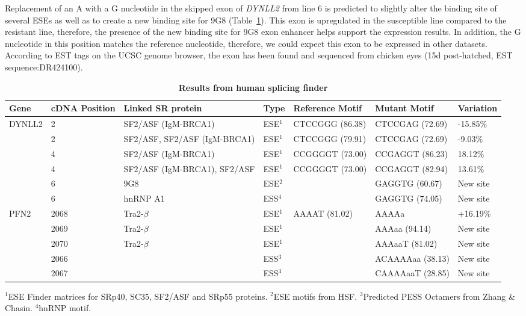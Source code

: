 Replacement of an A with a G nucleotide in the skipped exon of
{\em DYNLL2} from line 6 is predicted to slightly alter the
binding site of several ESEs as well as to create a new binding
site for 9G8 (Table~\ref{tab:spliceosome}).  This exon is
upregulated in the susceptible line compared to the resistant
line, therefore, the presence of the new binding site for 9G8
exon enhancer helps support the expression results.  In addition,
the G nucleotide in this position matches the reference
nucleotide, therefore, we could expect this exon to be expressed
in other datasets.  According to EST tags on the UCSC genome
browser, the exon has been found and sequenced from chicken eyes
(15d post-hatched, EST sequence:DR424100).

\clearpage\pagestyle{lscape}
\begin{landscape}
\begin{table}[!ht]
\caption{
\textbf{Results from human splicing finder}}
\begin{center}
\begin{tabular}{lp{1cm}p{3cm}llll}
\hline
Gene &  cDNA Position & Linked SR protein & Type & Reference Motif & Mutant Motif & Variation \\
\hline
DYNLL2 & 2 & SF2/ASF (IgM-BRCA1) & ESE$^{1}$ & CTCCGGG (86.38) & CTCCGAG (72.69) & -15.85\% \\
& 2 & SF2/ASF, SF2/ASF (IgM-BRCA1) & ESE$^{1}$ & CTCCGGG (79.91) & CTCCGAG (72.69) & -9.03\% \\
& 4 & SF2/ASF (IgM-BRCA1) & ESE$^{1}$& CCGGGGT (73.00) & CCGAGGT (86.23) & 18.12\% \\
& 4 & SF2/ASF (IgM-BRCA1), SF2/ASF & ESE$^{1}$ & CCGGGGT (73.00) & CCGAGGT (82.94) & 13.61\% \\
& 6 & 9G8 & ESE$^{2}$ & & GAGGTG (60.67) & New site \\
& 6 & hnRNP A1 & ESS$^{4}$& & GAGGTG (74.05) & New site \\
\hline
PFN2 & 2068 & Tra2-$\beta$ & ESE$^{1}$ & AAAAT (81.02) & AAAAa & +16.19\% \\
& 2069 & Tra2-$\beta$ & ESE$^{1}$ & & AAAaa (94.14) & New site \\
& 2070 & Tra2-$\beta$ & ESE$^{1}$ & & AAAaaT (81.02) & New site \\
 & 2066 & & ESS$^{3}$ & & ACAAAAaa (38.13) & New site \\
 & 2067 & & ESS$^{3}$ & & CAAAAaaT (28.85) & New site \\
\hline
\end{tabular}
\begin{flushleft}
    $^{1}$ESE Finder matrices for SRp40, SC35, SF2/ASF and SRp55 proteins.
    $^{2}$ESE motifs from HSF.
    $^{3}$Predicted PESS Octamers from Zhang \& Chasin.
    $^{4}$hnRNP motif.
\end{flushleft}
\label{tab:spliceosome}
\end{center}
\end{table}
\end{landscape}
\pagestyle{plain}

